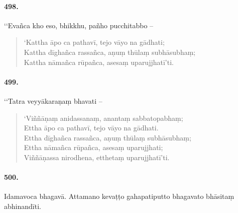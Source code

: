 \paragraph{498.} ‘‘Evañca kho eso, bhikkhu, pañho pucchitabbo –
\begin{verse}
  \small
  ‘Kattha āpo ca pathavī, tejo vāyo na gādhati;\\
  Kattha dīghañca rassañca, aṇuṃ thūlaṃ subhāsubhaṃ;\\
  Kattha nāmañca rūpañca, asesaṃ uparujjhatī’ti.\\
\end{verse}

\paragraph{499.} ‘‘Tatra veyyākaraṇaṃ bhavati –
\begin{verse}
  \small
  ‘Viññāṇaṃ anidassanaṃ, anantaṃ sabbatopabhaṃ;\\
  Ettha āpo ca pathavī, tejo vāyo na gādhati.\\[0.5cm]
  
  Ettha dīghañca rassañca, aṇuṃ thūlaṃ subhāsubhaṃ;\\
  Ettha nāmañca rūpañca, asesaṃ uparujjhati;\\
  Viññāṇassa nirodhena, etthetaṃ uparujjhatī’ti.\\
\end{verse}

\paragraph{500.} Idamavoca bhagavā. Attamano kevaṭṭo gahapatiputto bhagavato bhāsitaṃ abhinandīti.

